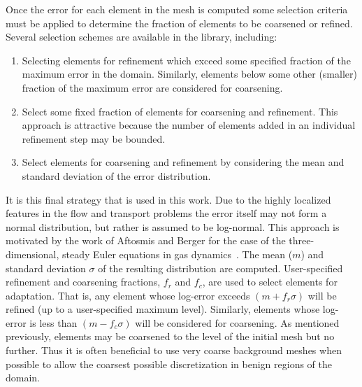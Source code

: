 
Once the error for each element in the mesh is computed some selection criteria must be applied to determine the fraction of elements to be coarsened or refined.  Several selection schemes are available in the \libMesh{} library, including:
\begin{enumerate}
  \tightlist
  \item Selecting elements for refinement which exceed some specified fraction of the maximum error in the domain.  Similarly, elements below some other (smaller) fraction of the maximum error are considered for coarsening.
  \item Select some fixed fraction of elements for coarsening and refinement.  This approach is attractive because the number of elements added in an individual refinement step may be bounded.
  \item Select elements for coarsening and refinement by considering the mean and standard deviation of the error distribution.
\end{enumerate}

It is this final strategy that is used in this work.  Due to the highly localized features in the flow and transport problems the error itself may not form a normal distribution, but rather is assumed to be  log-normal.  This approach is motivated by the work of  Aftosmis and Berger for the case of the three-dimensional, steady Euler equations in gas dynamics~\cite{aftosmis_berger_refinement}.  The mean ($m$) and standard deviation $\sigma$ of the resulting distribution are computed.  User-specified refinement and coarsening fractions, $f_r$ and $f_c$, are used to select elements for adaptation.  That is, any element whose log-error exceeds $\left(m+f_r \sigma\right)$ will be refined (up to a user-specified maximum level).  Similarly, elements whose log-error is less than \mbox{$\left(m-f_c \sigma\right)$} will be considered for coarsening.  As mentioned previously, elements may be coarsened to the level of the initial mesh but no further.  Thus it is often beneficial to use very coarse background meshes when possible to allow the coarsest possible discretization in benign regions of the domain.



